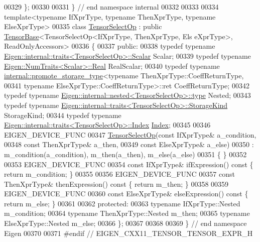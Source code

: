 \begin{DoxyCode}
00329 \};
00330 
00331 \}  \textcolor{comment}{// end namespace internal}
00332 
00333 
00334 \textcolor{keyword}{template}<\textcolor{keyword}{typename} IfXprType, \textcolor{keyword}{typename} ThenXprType, \textcolor{keyword}{typename} ElseXprType>
00335 \textcolor{keyword}{class }\hyperlink{class_eigen_1_1_tensor_select_op}{TensorSelectOp} : \textcolor{keyword}{public} \hyperlink{class_eigen_1_1_tensor_base}{TensorBase}<TensorSelectOp<IfXprType, ThenXprType, Els
      eXprType>, ReadOnlyAccessors>
00336 \{
00337   \textcolor{keyword}{public}:
00338     \textcolor{keyword}{typedef} \textcolor{keyword}{typename} \hyperlink{struct_eigen_1_1internal_1_1traits}{Eigen::internal::traits<TensorSelectOp>::Scalar}
       Scalar;
00339     \textcolor{keyword}{typedef} \textcolor{keyword}{typename} \hyperlink{group___sparse_core___module}{Eigen::NumTraits<Scalar>::Real} RealScalar;
00340     \textcolor{keyword}{typedef} \textcolor{keyword}{typename} \hyperlink{struct_eigen_1_1internal_1_1promote__storage__type}{internal::promote\_storage\_type}<\textcolor{keyword}{typename} 
      ThenXprType::CoeffReturnType,
00341                                                     \textcolor{keyword}{typename} ElseXprType::CoeffReturnType>::ret 
      CoeffReturnType;
00342     \textcolor{keyword}{typedef} \textcolor{keyword}{typename} \hyperlink{class_eigen_1_1internal_1_1_tensor_lazy_evaluator_writable}{Eigen::internal::nested<TensorSelectOp>::type}
       Nested;
00343     \textcolor{keyword}{typedef} \textcolor{keyword}{typename} \hyperlink{struct_eigen_1_1internal_1_1traits}{Eigen::internal::traits<TensorSelectOp>::StorageKind}
       StorageKind;
00344     \textcolor{keyword}{typedef} \textcolor{keyword}{typename} \hyperlink{struct_eigen_1_1internal_1_1traits}{Eigen::internal::traits<TensorSelectOp>::Index}
       \hyperlink{namespace_eigen_a62e77e0933482dafde8fe197d9a2cfde}{Index};
00345 
00346     EIGEN\_DEVICE\_FUNC
00347     \hyperlink{class_eigen_1_1_tensor_select_op}{TensorSelectOp}(\textcolor{keyword}{const} IfXprType& a\_condition,
00348                    \textcolor{keyword}{const} ThenXprType& a\_then,
00349                    \textcolor{keyword}{const} ElseXprType& a\_else)
00350       : m\_condition(a\_condition), m\_then(a\_then), m\_else(a\_else)
00351     \{ \}
00352 
00353     EIGEN\_DEVICE\_FUNC
00354     \textcolor{keyword}{const} IfXprType& ifExpression()\textcolor{keyword}{ const }\{ \textcolor{keywordflow}{return} m\_condition; \}
00355 
00356     EIGEN\_DEVICE\_FUNC
00357     \textcolor{keyword}{const} ThenXprType& thenExpression()\textcolor{keyword}{ const }\{ \textcolor{keywordflow}{return} m\_then; \}
00358 
00359     EIGEN\_DEVICE\_FUNC
00360     \textcolor{keyword}{const} ElseXprType& elseExpression()\textcolor{keyword}{ const }\{ \textcolor{keywordflow}{return} m\_else; \}
00361 
00362   \textcolor{keyword}{protected}:
00363     \textcolor{keyword}{typename} IfXprType::Nested m\_condition;
00364     \textcolor{keyword}{typename} ThenXprType::Nested m\_then;
00365     \textcolor{keyword}{typename} ElseXprType::Nested m\_else;
00366 \};
00367 
00368 
00369 \} \textcolor{comment}{// end namespace Eigen}
00370 
00371 \textcolor{preprocessor}{#endif // EIGEN\_CXX11\_TENSOR\_TENSOR\_EXPR\_H}
\end{DoxyCode}
